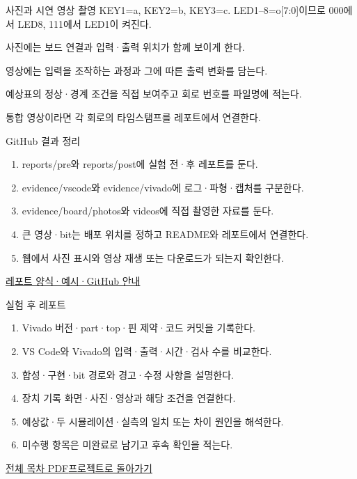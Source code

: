\begin{frame}{사진과 시연 영상 촬영}\relax
\small
KEY1=a, KEY2=b, KEY3=c. LED1–8=o[7:0]이므로 000에서 LED8, 111에서 LED1이 켜진다.\par\vspace{0.22cm}사진에는 보드 연결과 입력·출력 위치가 함께 보이게 한다.\par\vspace{0.22cm}영상에는 입력을 조작하는 과정과 그에 따른 출력 변화를 담는다.\par\vspace{0.22cm}예상표의 정상·경계 조건을 직접 보여주고 회로 번호를 파일명에 적는다.\par\vspace{0.22cm}통합 영상이라면 각 회로의 타임스탬프를 레포트에서 연결한다.\par
\end{frame}

\begin{frame}{GitHub 결과 정리}\relax
\small
\begin{enumerate}\setlength{\itemsep}{0.22cm}
\item reports/pre와 reports/post에 실험 전·후 레포트를 둔다.
\item evidence/vscode와 evidence/vivado에 로그·파형·캡처를 구분한다.
\item evidence/board/photos와 videos에 직접 촬영한 자료를 둔다.
\item 큰 영상·bit는 배포 위치를 정하고 README와 레포트에서 연결한다.
\item 웹에서 사진 표시와 영상 재생 또는 다운로드가 되는지 확인한다.
\end{enumerate}
\href{https://github.com/Glaysia/ece2_26_2_2/blob/daily/0910/example/fpga_projects_hdl/LAB1/docs/reports.md}{레포트 양식·예시·GitHub 안내}
\end{frame}

\begin{frame}{실험 후 레포트}\relax
\small
\begin{enumerate}\setlength{\itemsep}{0.22cm}
\item Vivado 버전·part·top·핀 제약·코드 커밋을 기록한다.
\item VS Code와 Vivado의 입력·출력·시간·검사 수를 비교한다.
\item 합성·구현·bit 경로와 경고·수정 사항을 설명한다.
\item 장치 기록 화면·사진·영상과 해당 조건을 연결한다.
\item 예상값·두 시뮬레이션·실측의 일치 또는 차이 원인을 해석한다.
\item 미수행 항목은 미완료로 남기고 후속 확인을 적는다.
\end{enumerate}
\href{04.LAB1_00_CONTENTS.pdf}{전체 목차 PDF}\quad\href{https://github.com/Glaysia/fpga-lab-example-vivado-2026-1-09-decoder3to8/tree/d5a11d33868dfb9ff71b7e598644099a9ce59b65}{프로젝트로 돌아가기}
\end{frame}
\endgroup

